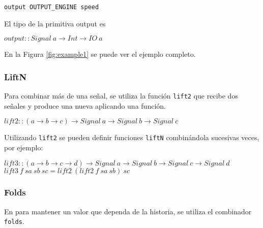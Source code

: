 \begin{center}
\begin{Verbatim}[frame=single]
output OUTPUT_ENGINE speed
\end{Verbatim}
\end{center}

  El tipo de la primitiva output es

\begin{center}
$output :: Signal\ a \rightarrow Int \rightarrow IO\ a$
\end{center}

 
  En la Figura \ref{fig:example1} se puede ver el ejemplo completo.



\subsubsection{LiftN}

  Para combinar más de una señal, se utiliza la función \texttt{lift2}
que recibe dos señales y produce una nueva aplicando una función.

\begin{center}
$lift2 :: (a \rightarrow b \rightarrow c) \rightarrow Signal\ a \rightarrow Signal\ b \rightarrow Signal\ c$
\end{center}

  Utilizando \texttt{lift2} se pueden definir funciones \texttt{liftN}
combinándola sucesivas veces, por ejemplo:

\begin{center}
$lift3 :: (a \rightarrow b \rightarrow c \rightarrow d) \rightarrow Signal\ a \rightarrow Signal\ b \rightarrow Signal\ c \rightarrow Signal\ d$
$lift3\ f\ sa\ sb\ sc = lift2\ (lift2\ f\ sa\ sb)\ sc$
\end{center}


\subsubsection{Folds}

  En \frob{} para mantener un valor que dependa de la historia, se utiliza
el combinador \texttt{folds}.

